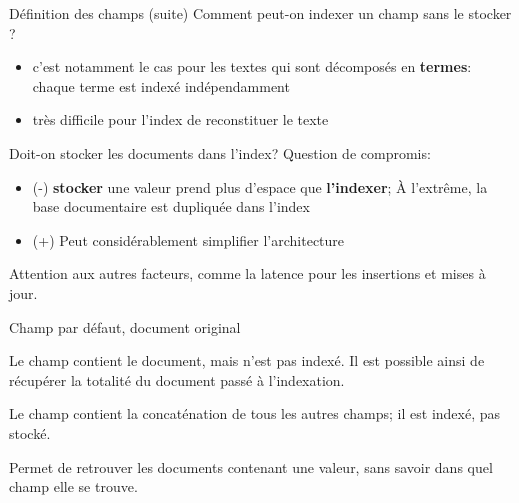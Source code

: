 \begin{frame}[fragile]{Définition des champs (suite)}
Comment peut-on indexer un champ sans le stocker ?
  \begin{itemize}
    \item c'est notamment le cas pour les textes qui sont décomposés en
      {\bf termes}: chaque terme est indexé indépendamment
    \item très difficile pour l'index de reconstituer le texte
  \end{itemize}

\vfill

Doit-on stocker les documents dans l'index? Question de compromis: 
\begin{itemize}
  \item (-) {\bf stocker} une valeur prend plus d'espace que {\bf l'indexer}; 
  À l'extrême,  la base documentaire
    est dupliquée dans l'index
  \item (+) Peut considérablement simplifier l'architecture
\end{itemize}

\vfill

\begin{blocgauche}
Attention aux autres facteurs, comme la latence pour les insertions
et mises à jour.
\end{blocgauche}

\end{frame}

\begin{frame}[fragile]{Champ par défaut, document original}

Le champ  contient le document, mais n'est pas indexé. Il est
possible ainsi de récupérer la totalité du document passé à l'indexation. 

\vfill

Le champ  contient la concaténation de tous les autres champs; il
est indexé, pas stocké.
      
\vfill
\begin{blocgauche}
Permet de
retrouver les documents contenant une valeur, sans savoir dans quel champ elle
se trouve. 
\end{blocgauche}
\end{frame}

